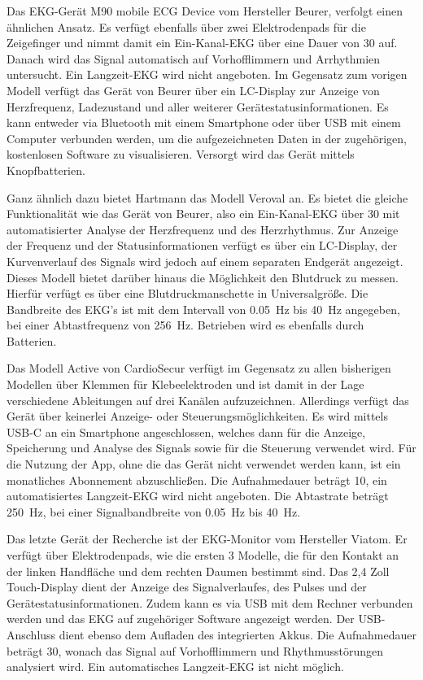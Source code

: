Das EKG-Gerät M90 mobile ECG Device vom Hersteller Beurer, verfolgt einen ähnlichen Ansatz. Es verfügt ebenfalls über zwei Elektrodenpads für die Zeigefinger und nimmt damit ein Ein-Kanal-EKG über eine Dauer von \SI{30}{\sec} auf. Danach wird das Signal automatisch auf Vorhofflimmern und Arrhythmien untersucht. Ein Langzeit-EKG wird nicht angeboten. Im Gegensatz zum vorigen Modell verfügt das Gerät von Beurer über ein LC-Display zur Anzeige von Herzfrequenz, Ladezustand und aller weiterer Gerätestatusinformationen. Es kann entweder via Bluetooth mit einem Smartphone oder über USB mit einem Computer verbunden werden, um die aufgezeichneten Daten in der zugehörigen, kostenlosen Software zu visualisieren. Versorgt wird das Gerät mittels Knopfbatterien.

Ganz ähnlich dazu bietet Hartmann das Modell Veroval an. Es bietet die gleiche Funktionalität wie das Gerät von Beurer, also ein Ein-Kanal-EKG über \SI{30}{\sec} mit automatisierter Analyse der Herzfrequenz und des Herzrhythmus. Zur Anzeige der Frequenz und der Statusinformationen verfügt es über ein LC-Display, der Kurvenverlauf des Signals wird jedoch auf einem separaten Endgerät angezeigt. Dieses Modell bietet darüber hinaus die Möglichkeit den Blutdruck zu messen. Hierfür verfügt es über eine Blutdruckmanschette in Universalgröße. Die Bandbreite des EKG's ist mit dem Intervall von \SI{0.05} {\hertz} bis \SI{40} {\hertz} angegeben, bei einer Abtastfrequenz von \SI{256} {\hertz}. Betrieben wird es ebenfalls durch Batterien. 

Das Modell Active von CardioSecur verfügt im Gegensatz zu allen bisherigen Modellen über Klemmen für Klebeelektroden und ist damit in der Lage verschiedene Ableitungen auf drei Kanälen aufzuzeichnen. Allerdings verfügt das Gerät über keinerlei Anzeige- oder Steuerungsmöglichkeiten. Es wird mittels USB-C an ein Smartphone angeschlossen, welches dann für die Anzeige, Speicherung und Analyse des Signals sowie für die Steuerung verwendet wird. Für die Nutzung der App, ohne die das Gerät nicht verwendet werden kann, ist ein monatliches Abonnement abzuschließen. Die Aufnahmedauer beträgt \SI{10}{\sec}, ein automatisiertes Langzeit-EKG wird nicht angeboten. Die Abtastrate beträgt \SI{250}{\hertz}, bei einer Signalbandbreite von \SI{0.05} {\hertz} bis \SI{40} {\hertz}.

Das letzte Gerät der Recherche ist der EKG-Monitor vom Hersteller Viatom. Er verfügt über Elektrodenpads, wie die ersten 3 Modelle, die für den Kontakt an der linken Handfläche und dem rechten Daumen bestimmt sind. Das 2,4 Zoll Touch-Display dient der Anzeige des Signalverlaufes, des Pulses und der Gerätestatusinformationen. Zudem kann es via USB mit dem Rechner verbunden werden und das EKG auf zugehöriger Software angezeigt werden. Der USB-Anschluss dient ebenso dem Aufladen des integrierten Akkus. Die Aufnahmedauer beträgt \SI{30}{\sec}, wonach das Signal auf Vorhofflimmern und Rhythmusstörungen analysiert wird. Ein automatisches Langzeit-EKG ist nicht möglich. 

